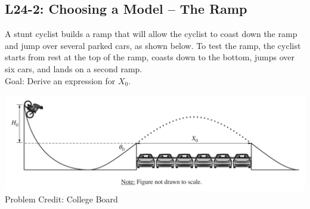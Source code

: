 \documentclass[]{article}
\newcommand{\Week}{24}
\begin{document}
\begin{PresentSpace}
\vspace{-10pt}
\section*{L\Week-2: Choosing a Model -- The Ramp}
\vspace{-5pt}
A stunt cyclist builds a ramp that will allow the cyclist to coast down the ramp and jump over several parked cars, as shown below. To test the ramp, the cyclist starts from rest at the top of the ramp, coasts down to the bottom, jumps over six cars, and lands on a second ramp. \\

\noindent Goal: Derive an expression for $X_{0}$.
\begin{center}
	\includegraphics[scale=0.2]{JumpRamp.png} \\
	\small
	Problem Credit: College Board 
\end{center}
\end{PresentSpace}
\newpage
\end{document}
